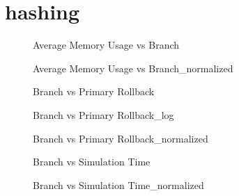 \section{hashing}
\begin{figure}[H]
\centering

\caption{Average Memory Usage vs Branch}
\end{figure}
\vspace{1cm}
\begin{figure}[H]
\centering

\caption{Average Memory Usage vs Branch\_normalized}
\end{figure}
\vspace{1cm}
\newpage
\begin{figure}[H]
\centering

\caption{Branch vs Primary Rollback}
\end{figure}
\vspace{1cm}
\begin{figure}[H]
\centering

\caption{Branch vs Primary Rollback\_log}
\end{figure}
\vspace{1cm}
\newpage
\begin{figure}[H]
\centering

\caption{Branch vs Primary Rollback\_normalized}
\end{figure}
\vspace{1cm}
\begin{figure}[H]
\centering

\caption{Branch vs Simulation Time}
\end{figure}
\vspace{1cm}
\newpage
\begin{figure}[H]
\centering

\caption{Branch vs Simulation Time\_normalized}
\end{figure}
